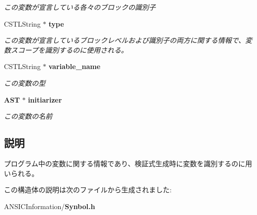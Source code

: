 \begin{DoxyCompactItemize}
\begin{DoxyCompactList}\small\item\em この変数が宣言している各々のブロックの識別子 \item\end{DoxyCompactList}\item 
CSTLString $\ast$ {\bf type}\label{structvariable__table_a3fbbc0d31aed9894be0bddaf8cb4af49}

\begin{DoxyCompactList}\small\item\em この変数が宣言しているブロックレベルおよび識別子の両方に関する情報で、変数スコープを識別するのに使用される。 \item\end{DoxyCompactList}\item 
CSTLString $\ast$ {\bf variable\_\-name}\label{structvariable__table_a5f81ceac01a5b8c2632ddd2e1588436b}

\begin{DoxyCompactList}\small\item\em この変数の型 \item\end{DoxyCompactList}\item 
{\bf AST} $\ast$ {\bf initiarizer}\label{structvariable__table_ad1094019a19afcd1acf8b9242e501bf5}

\begin{DoxyCompactList}\small\item\em この変数の名前 \item\end{DoxyCompactList}\end{DoxyCompactItemize}


\subsection{説明}
プログラム中の変数に関する情報であり、検証式生成時に変数を識別するのに用いられる。 

この構造体の説明は次のファイルから生成されました:\begin{DoxyCompactItemize}
\item 
ANSICInformation/{\bf Synbol.h}\end{DoxyCompactItemize}
